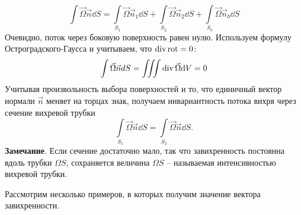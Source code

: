 \begin{equation}
 	\int \vec \Omega \vec{n} \dd S=\int\limits_{S_1} \vec \Omega \vec{n}_1 \dd S  + \int\limits_{S_2} \vec \Omega \vec{n}_2 \dd S + \int\limits_{S_b} \vec \Omega \vec{n}_b \dd S
 \end{equation} 
Очевидно, поток через боковую поверхность равен нулю. Используем формулу Остроградского-Гаусса и учитываем, что $\operatorname{div} \operatorname{rot} = 0$:
\begin{equation}
	\int \vec \Omega \vec{n} dS=\iiint \operatorname{div}\vec \Omega \dd V=0
\end{equation}
Учитывая произвольность выбора поверхностей и то, что единичный
вектор нормали $\vec{n}$ меняет на торцах знак,
получаем инвариантность потока вихря через сечение вихревой трубки
\begin{equation}
	\int\limits_{S_1} \vec \Omega \vec{n} \dd S=\int\limits_{S_2} \vec \Omega \vec{n} \dd S.
\end{equation}
\textbf{Замечание}.
Если сечение достаточно мало, так что завихренность постоянна вдоль
трубки $\Omega S$, сохраняется величина $\Omega S$ -- называемая интенсивностью вихревой трубки.

Рассмотрим несколько примеров, в которых получим значение вектора завихренности.

\newpage

